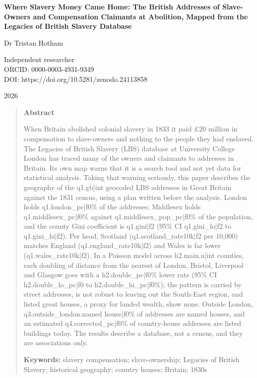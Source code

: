 \documentclass[11pt,a4paper]{article}
\begin{document}
\begin{center}
{\Large\bfseries Where Slavery Money Came Home: The British Addresses of Slave-Owners and Compensation Claimants at Abolition, Mapped from the Legacies of British Slavery Database\par}
\vspace{1.2em}
{\large Dr Tristan Hotham\par}
\vspace{0.3em}
{\small Independent researcher\\
ORCID: 0000-0003-4931-9349\\
DOI: https://doi.org/10.5281/zenodo.24113858\par}
\vspace{0.8em}
2026
\end{center}

\begin{quote}
\small
\begin{center}\textbf{Abstract}\end{center}
When Britain abolished colonial slavery in 1833 it paid \pounds 20 million in compensation to slave-owners and nothing to the people they had enslaved. The Legacies of British Slavery (LBS) database at University College London has traced many of the owners and claimants to addresses in Britain. Its own map warns that it is a search tool and not yet data for statistical analysis. Taking that warning seriously, this paper describes the geography of the {{q1.gb|int}} geocoded LBS addresses in Great Britain against the 1831 census, using a plan written before the analysis. London holds {{q1.london_pc|f0}}\% of the addresses; Middlesex holds {{q1.middlesex_pc|f0}}\% against {{q1.middlesex_pop_pc|f0}}\% of the population, and the county Gini coefficient is {{q1.gini|f2}} (95\% CI {{q1.gini_lo|f2}} to {{q1.gini_hi|f2}}). Per head, Scotland ({{q1.scotland_rate10k|f2}} per 10,000) matches England ({{q1.england_rate10k|f2}}) and Wales is far lower ({{q1.wales_rate10k|f2}}). In a Poisson model across {{h2.main.n|int}} counties, each doubling of distance from the nearest of London, Bristol, Liverpool and Glasgow goes with a {{h2.double_pc|f0}}\% lower rate (95\% CI {{h2.double_lo_pc|f0}} to {{h2.double_hi_pc|f0}}\%); the pattern is carried by street addresses, is not robust to leaving out the South-East region, and listed great houses, a proxy for landed wealth, show none. Outside London, {{q3.outside_london.named house|f0}}\% of addresses are named houses, and an estimated {{q4.corrected_pc|f0}}\% of country-house addresses are listed buildings today. The results describe a database, not a census, and they are associations only.

\textbf{Keywords:} slavery compensation; slave-ownership; Legacies of British Slavery; historical geography; country houses; Britain; 1830s
\end{quote}
\end{document}
